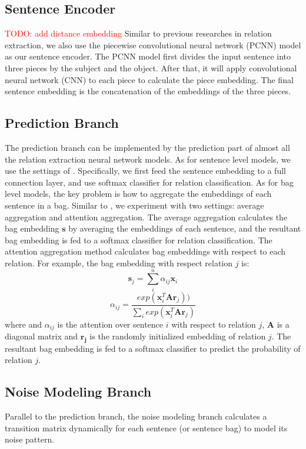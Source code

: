 \documentclass[11pt,a4paper]{article}
\newcommand{\todo}[1]{\textcolor{red}{TODO: #1}\PackageWarning{TODO:}{#1!}}
\begin{document}
\subsection{Sentence Encoder}
\todo{add distance embedding}
Similar to previous researches in relation extraction, we also use the piecewise convolutional neural network (PCNN) model \cite{zeng2015distant} as our sentence encoder. The PCNN model first divides the input sentence into three pieces by the subject and the object. After that, it will apply convolutional neural network (CNN) to each piece to calculate the piece embedding. The final sentence embedding is the concatenation of the embeddings of the three pieces.

\subsection{Prediction Branch}
The prediction branch can be implemented by the prediction part of almost all the relation extraction neural network models. As for sentence level models, we use the settings of \cite{luo2016temporal}. Specifically, we first feed the sentence embedding to a full connection layer, and use softmax classifier for relation classification. As for bag level models, the key problem is how to aggregate the embeddings of each sentence in a bag. Similar to \cite{lin2016neural}, we experiment with two settings: average aggregation and attention aggregation. The average aggregation calculates the bag embedding $\mathbf{s}$ by averaging the embeddings of each sentence, and the resultant bag embedding is fed to a softmax classifier for relation classification. The attention aggregation method \cite{lin2016neural} calculates bag embeddings with respect to each relation. For example, the bag embedding with respect relation $j$ is:
\begin{equation}
\mathbf{s}_j = \sum_i^{n}{\alpha_{ij} \mathbf{x}_{i}}
\end{equation}
\begin{equation}
\alpha_{ij} = \frac{exp(\mathbf{x}_{i}^T \mathbf{Ar}_j))}{\sum_{i}{exp(\mathbf{x}_{i}^T \mathbf{Ar}_j)}}
\end{equation}
where and $\alpha_{ij}$ is the attention over sentence $i$ with respect to relation $j$, $\mathbf{A}$ is a diagonal matrix and $\mathbf{r_j}$ is the randomly initialized embedding of relation $j$. The resultant bag embedding is fed to a softmax classifier to predict the probability of relation $j$.

\subsection{Noise Modeling Branch}
Parallel to the prediction branch, the noise modeling branch calculates a transition matrix dynamically for each sentence (or sentence bag) to model its noise pattern.
\end{document}
